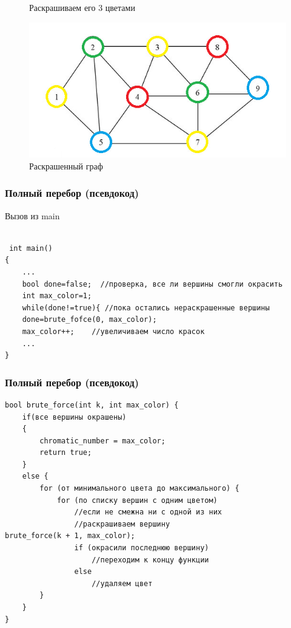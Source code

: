 \documentclass{beamer}
\begin{document}
{\begin{figure}[!tbp]
\begin{minipage}[b]{0.4\textwidth}
				\caption{Раскрашиваем его 3 цветами}
			\end{minipage}
			\hfill
			\begin{minipage}[b]{0.4\textwidth}
				\includegraphics[width=\textwidth]{polnyiper4}
				\caption{Раскрашенный граф}
			\end{minipage}
		\end{figure}
		
	}
	
	\begin{frame}[fragile]
		\frametitle{Полный перебор (псевдокод)}
		Вызов из main\\
		\begin{lstlisting}
   
 int main()
{
	...
    bool done=false;  //проверка, все ли вершины смогли окрасить
    int max_color=1;
    while(done!=true){ //пока остались нераскрашенные вершины
    done=brute_fofce(0, max_color);
    max_color++;	//увеличиваем число красок
   	...
}
		\end{lstlisting}
	\end{frame}
	
	\begin{frame}[fragile]
		\frametitle{Полный перебор (псевдокод)}
		\begin{lstlisting}
bool brute_force(int k, int max_color) {
	if(все вершины окрашены)
	{
		chromatic_number = max_color;
		return true;
	}
	else {
		for (от минимального цвета до максимального) {
			for (по списку вершин с одним цветом)
				//если не смежна ни с одной из них
				//раскрашиваем вершину																	brute_force(k + 1, max_color);
				if (окрасили последнюю вершину)
					//переходим к концу функции
				else
					//удаляем цвет
		}
	}
}

	\end{lstlisting}
	\end{frame}
		
\end{document}
